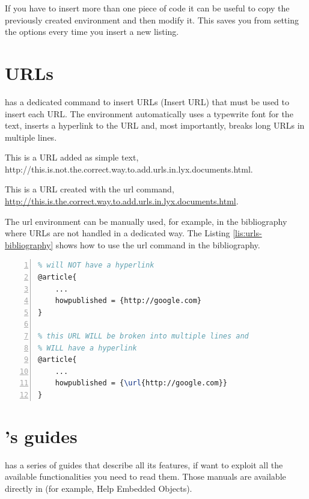 If you have to insert more than one piece of code it can be useful
to copy the previously created environment and then modify it. This
saves you from setting the options every time you insert a new listing.

\section{URLs}

\LyX{} has a dedicated command to insert URLs (\textsf{Insert \lyxarrow{}
URL}) that must be used to insert each URL. The environment automatically
uses a typewrite font for the text, inserts a hyperlink to the URL
and, most importantly, breaks long URLs in multiple lines.

This is a URL added as simple text, http://this.is.not.the.correct.way.to.add.urls.in.lyx.documents.html.

This is a URL created with the \textsf{url} command, \url{http://this.is.the.correct.way.to.add.urls.in.lyx.documents.html}.

The \textsf{url} environment can be manually used, for example, in
the bibliography where URLs are not handled in a dedicated way. The
Listing \ref{lis:urls-bibliography} shows how to use the url command
in the bibliography.

\begin{lstlisting}[caption={How to insert URLs in the bibliography},label={lis:urls-bibliography},basicstyle={\small\ttfamily},breaklines=true,commentstyle={\color{purple!60!black}},extendedchars=true,identifierstyle={\color{blue!50!black}},keywordstyle={\bfseries\color{green!50!black}},language=TeX,numbers=left,numberstyle={\footnotesize},showstringspaces=false,stringstyle={\color{orange!40!black}},tabsize=4,xleftmargin=2em]
% this URL will not be broken into multiple lines and
% will NOT have a hyperlink
@article{
    ...
    howpublished = {http://google.com}
}

% this URL WILL be broken into multiple lines and
% WILL have a hyperlink
@article{
    ...
    howpublished = {\url{http://google.com}}
}
\end{lstlisting}


\section{\protect\LyX 's guides}

\LyX{} has a series of guides that describe all its features, if want
to exploit all the available functionalities you need to read them.
Those manuals are available directly in \LyX{} (for example, \textsf{Help}
\textsf{\lyxarrow{} Embedded Objects}).
